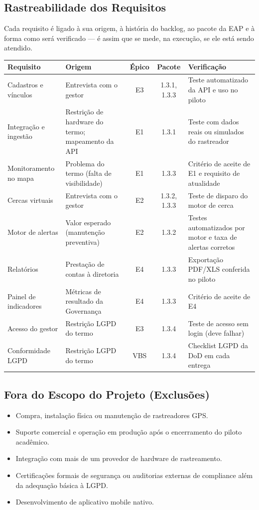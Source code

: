 \documentclass[11pt,a4paper]{article}
\begin{document}
\subsection{Rastreabilidade dos Requisitos}\label{esc:rastreabilidade}
Cada requisito é ligado à sua origem, à história do backlog, ao pacote da EAP e à forma como será verificado --- é assim que se mede, na execução, se ele está sendo atendido.

\begin{center}
\small
\begin{tabularx}{\textwidth}{L L c c L}
\toprule
\textbf{Requisito} & \textbf{Origem} & \textbf{Épico} & \textbf{Pacote} & \textbf{Verificação} \\
\midrule
Cadastros e vínculos & Entrevista com o gestor & E3 & 1.3.1, 1.3.3 & Teste automatizado da API e uso no piloto \\
Integração e ingestão & Restrição de hardware do termo; mapeamento da API & E1 & 1.3.1 & Teste com dados reais ou simulados do rastreador \\
Monitoramento no mapa & Problema do termo (falta de visibilidade) & E1 & 1.3.3 & Critério de aceite de E1 e requisito de atualidade \\
Cercas virtuais & Entrevista com o gestor & E2 & 1.3.2, 1.3.3 & Teste de disparo do motor de cerca \\
Motor de alertas & Valor esperado (manutenção preventiva) & E2 & 1.3.2 & Testes automatizados por motor e taxa de alertas corretos \\
Relatórios & Prestação de contas à diretoria & E4 & 1.3.3 & Exportação PDF/XLS conferida no piloto \\
Painel de indicadores & Métricas de resultado da Governança & E4 & 1.3.3 & Critério de aceite de E4 \\
Acesso do gestor & Restrição LGPD do termo & E3 & 1.3.4 & Teste de acesso sem login (deve falhar) \\
Conformidade LGPD & Restrição LGPD do termo & VBS & 1.3.4 & Checklist LGPD da DoD em cada entrega \\
\bottomrule
\end{tabularx}
\end{center}

\subsection{Fora do Escopo do Projeto (Exclusões)}
\begin{itemize}[itemsep=2pt]
  \item Compra, instalação física ou manutenção de rastreadores GPS.
  \item Suporte comercial e operação em produção após o encerramento do piloto acadêmico.
  \item Integração com mais de um provedor de hardware de rastreamento.
  \item Certificações formais de segurança ou auditorias externas de compliance além da adequação básica à LGPD.
  \item Desenvolvimento de aplicativo mobile nativo.
\end{itemize}
\end{document}
